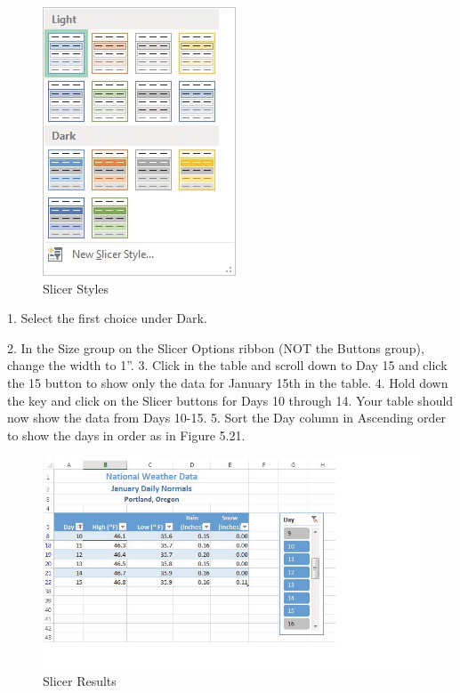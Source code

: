 \begin{figure}[H]
	\centering
	\includegraphics[width=\maxwidth{.95\linewidth}]{gfx/ch05_fig20}
	\caption{Slicer Styles}
	\label{05:fig20}
\end{figure}






1. Select the first choice under Dark.


2. In the Size group on the Slicer Options ribbon (NOT the Buttons group), change the width to 1”.
3. Click in the table and scroll down to Day 15 and click the 15 button to show only the data for
January 15th in the table.
4. Hold down the  key and click on the Slicer buttons for Days 10 through 14. Your table
should now show the data from Days 10-15.
5. Sort the Day column in Ascending order to show the days in order as in Figure 5.21.


\begin{figure}[H]
	\centering
	\includegraphics[width=\maxwidth{.95\linewidth}]{gfx/ch05_fig21}
	\caption{Slicer Results}
	\label{05:fig21}
\end{figure}





